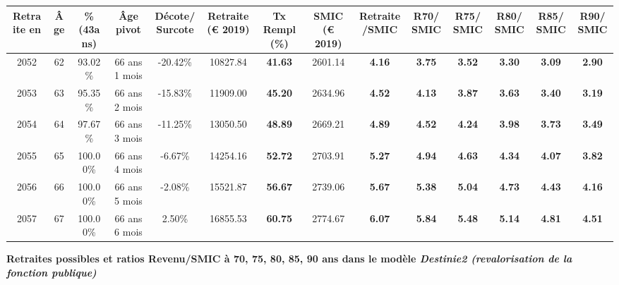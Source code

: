 \begin{adjustbox}{max width=\textwidth} 
\begin{tabular}[htb]{|c|c||c|c|c||c|c||c|c||c|c|c|c|c|} 
\hline 
 Retraite en &  Âge &  \%(43ans) &  Âge pivot &  Décote/Surcote &  Retraite (\euro{} 2019) &  Tx Rempl(\%) &  SMIC (\euro{} 2019) &  Retraite/SMIC &  R70/SMIC &  R75/SMIC &  R80/SMIC &  R85/SMIC &  R90/SMIC \\ 
\hline \hline 
 2052 &  62 &  93.02\% &  66 ans 1 mois &  -20.42\% &  10827.84 &  {\bf 41.63} &  2601.14 &  {\bf 4.16} &  {\bf 3.75} &  {\bf 3.52} &  {\bf 3.30} &  {\bf 3.09} &  {\bf 2.90} \\ 
\hline 
 2053 &  63 &  95.35\% &  66 ans 2 mois &  -15.83\% &  11909.00 &  {\bf 45.20} &  2634.96 &  {\bf 4.52} &  {\bf 4.13} &  {\bf 3.87} &  {\bf 3.63} &  {\bf 3.40} &  {\bf 3.19} \\ 
\hline 
 2054 &  64 &  97.67\% &  66 ans 3 mois &  -11.25\% &  13050.50 &  {\bf 48.89} &  2669.21 &  {\bf 4.89} &  {\bf 4.52} &  {\bf 4.24} &  {\bf 3.98} &  {\bf 3.73} &  {\bf 3.49} \\ 
\hline 
 2055 &  65 &  100.00\% &  66 ans 4 mois &  -6.67\% &  14254.16 &  {\bf 52.72} &  2703.91 &  {\bf 5.27} &  {\bf 4.94} &  {\bf 4.63} &  {\bf 4.34} &  {\bf 4.07} &  {\bf 3.82} \\ 
\hline 
 2056 &  66 &  100.00\% &  66 ans 5 mois &  -2.08\% &  15521.87 &  {\bf 56.67} &  2739.06 &  {\bf 5.67} &  {\bf 5.38} &  {\bf 5.04} &  {\bf 4.73} &  {\bf 4.43} &  {\bf 4.16} \\ 
\hline 
 2057 &  67 &  100.00\% &  66 ans 6 mois &  2.50\% &  16855.53 &  {\bf 60.75} &  2774.67 &  {\bf 6.07} &  {\bf 5.84} &  {\bf 5.48} &  {\bf 5.14} &  {\bf 4.81} &  {\bf 4.51} \\ 
\hline 
\hline 
\end{tabular} 
\end{adjustbox} 
 
 \vspace{0.1cm} 
{\bf \noindent Retraites possibles et ratios Revenu/SMIC à 70, 75, 80, 85, 90 ans dans le modèle \emph{Destinie2 (revalorisation de la fonction publique)}}  
 
